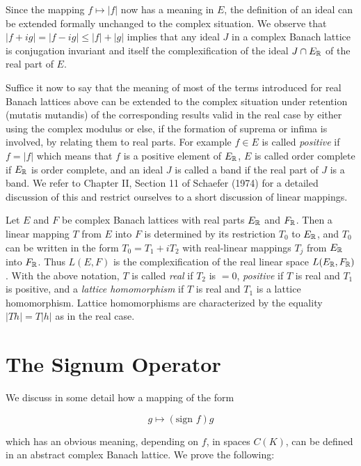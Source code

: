 Since the mapping $ f \mapsto |f| $ now has a meaning in $ E $, the definition of an ideal can be extended formally unchanged to the complex situation.
We observe that $ |f+ig| = |f-ig| \leq |f|+|g| $ implies that any ideal $ J $ in a complex Banach lattice is conjugation invariant and itself the complexification of the ideal $ J \cap E_{\mathbb{R}} $ of the real part of $ E $.

Suffice it now to say that the meaning of most of the terms introduced for real Banach lattices above can be extended to the complex situation under retention (mutatis mutandis) of the corresponding results valid in the real case by either using the complex modulus or else, if the formation of suprema or infima is involved, by relating them to real parts.
For example $ f \in E $ is called \emph{positive} if $ f = |f| $ which means that $ f $ is a positive element of $ E_{\mathbb{R}} $, $ E $ is called order complete if $ E_{\mathbb{R}} $ is order complete, and an ideal $ J $ is called a band if the real part of $ J $ is a band.
We refer to Chapter II, Section 11 of Schaefer (1974) for a detailed discussion of this and restrict ourselves to a short discussion of linear mappings.

Let $ E $ and $ F $ be complex Banach lattices with real parts $ E_{\mathbb{R}} $ and $ F_{\mathbb{R}} $.
Then a linear mapping $ T $ from $ E $ into $ F $ is determined by its restriction $ T_{0} $ to $ E_{\mathbb{R}} $, and $ T_{0} $ can be written in the form $ T_{0} = T_{1} + iT_{2} $ with real-linear mappings $ T_{j} $ from $ E_{\mathbb{R}} $ into $ F_{\mathbb{R}} $.
Thus $ L(E,F) $ is the complexification of the real linear space $ L(E_{\mathbb{R}},F_{\mathbb{R}}) $.
With the above notation, $ T $ is called \emph{real} if $ T_{2} $ is $ = 0 $, \emph{positive} if $ T $ is real and $ T_{1} $ is positive, and a \emph{lattice homomorphism} if $ T $ is real and $ T_{1} $ is a lattice homomorphism.
Lattice homomorphisms are characterized by the equality $ |Th| = T|h| $ as in the real case.




\pagebreak

\section{The Signum Operator}\label{sec:c1-8}

We discuss in some detail how a mapping of the form

\[
g \mapsto (\text{sign } f)g
\]

which has an obvious meaning, depending on $ f $, in spaces $ C(K) $, can be defined in an abstract complex Banach lattice.
We prove the following:

